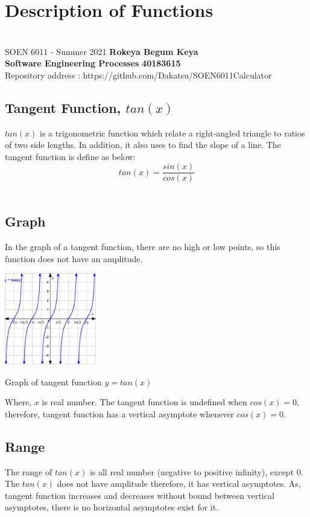 \documentclass[a4paper, 11pt]{report}
\begin{document}
\tableofcontents
\newpage
{}
\section*{Description of Functions}
\section*{}
\normalsize {SOEN 6011 - Summer 2021} \hfill \textbf{Rokeya Begum Keya} \\
\textbf{ Software Engineering Processes}  \hfill \textbf{40183615} \\
\hfill Repository address : https://github.com/Dakatsu/SOEN6011Calculator
\\
 \subsection*{ Tangent Function, $tan(x)$ } 
 \normalsize{$tan(x)$ is a trigonometric function which relate a right-angled triangle to ratios of two side lengths. In addition, it also uses to find the slope of a line. The tangent function is define as below: \[tan(x) = \frac{sin(x)}{cos(x)}\]}
 \
 \subsection*{Graph}
 \normalsize{In the graph of a tangent function, there are no high or low points, so this function does not have an amplitude.}
 \begin{center}
\includegraphics[width= 4cm]{tan}
\end{center}
\begin{center}
Graph of tangent function $y = tan(x)$\end{center}
 \normalsize{Where, $x$ is real number. The tangent function is undefined when $cos(x) = 0 $, therefore, tangent function has a vertical asymptote whenever $cos(x) = 0 $. }
 \subsection*{Range}
 \normalsize{ The range of $tan(x)$ is all real number (negative to positive infinity), except 0. The $tan(x)$ does not have amplitude therefore, it has vertical asymptotes. As, tangent function increases and decreases without bound between vertical asymptotes, there is no horizontal asymptotes exist for it.}
 
\end{document}
